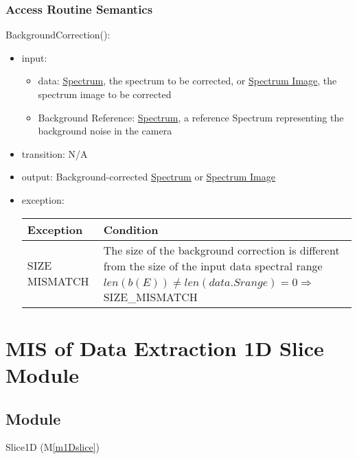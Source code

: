 \documentclass[12pt, titlepage]{article}
\newcommand{\mref}[1]{M\ref{#1}}
\begin{document}
\subsubsection{Access Routine Semantics}
\noindent BackgroundCorrection():
\begin{itemize}
    \item input: 
    \begin{itemize}
        \item data: \hyperref[Mod:Spectrum]{Spectrum}, the spectrum to be
        corrected, or \hyperref[Mod:SI]{Spectrum Image}, the spectrum image to be
        corrected
        \item Background Reference: \hyperref[Mod:Spectrum]{Spectrum}, a
        reference Spectrum representing the background noise in the camera
    \end{itemize}
    \item transition: N/A
    \item output: Background-corrected \hyperref[Mod:Spectrum]{Spectrum} or
    \hyperref[Mod:SI]{Spectrum Image}
    \item exception:
    \begin{center}
        \begin{tabular}{p{3.5cm} p{12cm}}
            \toprule[0.15em]
            \textbf{Exception} & \textbf{Condition}\\
            \midrule[0.1em]
            \multirow{2}{0.25\textwidth}{SIZE MISMATCH} & The size of the
            background correction is different from the size of the input data spectral
            range\\ 
            & $len(b(E)) \neq len(data.Srange) = 0 \Rightarrow$ SIZE\_MISMATCH\\
            
            \bottomrule[0.15em]
        \end{tabular}
    \end{center}
\end{itemize}

\newpage
\section{MIS of Data Extraction 1D Slice Module} \label{Mod:Slice1D}

\subsection{Module}
Slice1D (\mref{m1Dslice})
\end{document}
